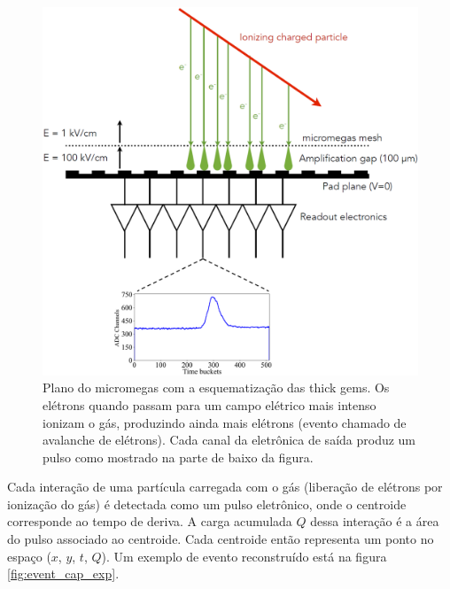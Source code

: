 \documentclass[a4paper,12pt,oneside]{book}
\begin{document}
\begin{figure}[H]
    \centering
    \includegraphics[scale = 0.40]{figs/thick_gems_2.png}
    \caption{Plano do micromegas com a esquematização das thick gems. Os elétrons quando passam para um campo elétrico mais intenso ionizam o gás, produzindo ainda mais elétrons (evento chamado de avalanche de elétrons). Cada canal da eletrônica de saída produz um pulso como mostrado na parte de baixo da figura.}
    \label{fig:thick_gems}
\end{figure}


\par Cada interação de uma partícula carregada com o gás (liberação de elétrons por ionização do gás) é detectada como um pulso eletrônico, onde o centroide corresponde ao tempo de deriva. A carga acumulada $Q$ dessa interação é a área do pulso associado ao centroide. Cada centroide então representa um ponto no espaço ($x$, $y$, $t$, $Q$). Um exemplo de evento reconstruído está na figura \ref{fig:event_cap_exp}.
\end{document}
